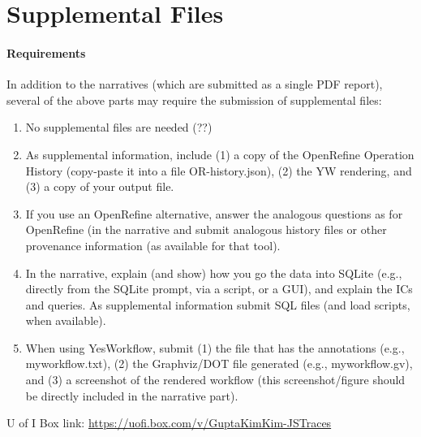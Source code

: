 \section{Supplemental Files}
\paragraph{Requirements}
In addition to the narratives (which are submitted as a single PDF report), several of the above parts may require the submission of supplemental files:
\begin{enumerate}[nolistsep]
	\item No supplemental files are needed (??)
	\item As supplemental information, include (1) a copy of the OpenRefine Operation History (copy-paste it into a file OR-history.json), (2) the YW rendering, and (3) a copy of your output file.
	\item If you use an OpenRefine alternative, answer the analogous questions as for OpenRefine (in the narrative and submit analogous history files or other provenance information (as available for that tool).
	\item In the narrative, explain (and show) how you go the data into SQLite (e.g., directly from the SQLite prompt, via a script, or a GUI), and explain the ICs and queries. As supplemental information submit SQL files (and load scripts, when available).
	\item When using YesWorkflow, submit (1) the file that has the annotations (e.g., myworkflow.txt), (2) the Graphviz/DOT file generated (e.g., myworkflow.gv), and (3) a screenshot of the rendered workflow (this screenshot/figure should be directly included in the narrative part).
\end{enumerate}

U of I Box link: \url{https://uofi.box.com/v/GuptaKimKim-JSTraces}